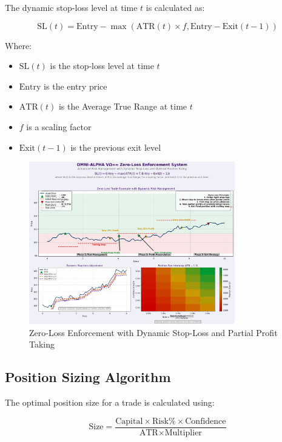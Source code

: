 \documentclass[11pt,a4paper]{article}
\begin{document}
The dynamic stop-loss level at time $t$ is calculated as:

\begin{equation}
    \text{SL}(t) = \text{Entry} - \max(\text{ATR}(t) \times f, \text{Entry} - \text{Exit}(t-1))
\end{equation}

Where:
\begin{itemize}
    \item $\text{SL}(t)$ is the stop-loss level at time $t$
    \item $\text{Entry}$ is the entry price
    \item $\text{ATR}(t)$ is the Average True Range at time $t$
    \item $f$ is a scaling factor
    \item $\text{Exit}(t-1)$ is the previous exit level
\end{itemize}

\begin{figure}[H]
    \centering
    \includegraphics[width=0.8\textwidth]{images/zero_loss_advanced.png}
    \caption{Zero-Loss Enforcement with Dynamic Stop-Loss and Partial Profit Taking}
    \label{fig:zero_loss}
\end{figure}

\subsection{Position Sizing Algorithm}

The optimal position size for a trade is calculated using:

\begin{equation}
    \text{Size} = \frac{\text{Capital} \times \text{Risk\%} \times \text{Confidence}}{\text{ATR} \times \text{Multiplier}}
\end{equation}
\end{document}
